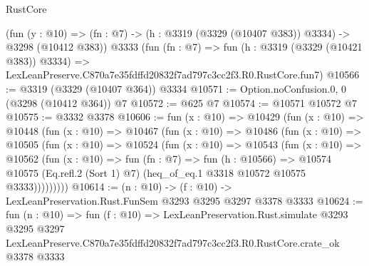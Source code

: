 \begin{lexlean}{RustCore}
\begin{coremodule}
    (fun (y : @10) => (fn : @7) -> (h : @3319 (@3329 (@10407 @383)) @3334) -> @3298 (@10412 @383))
    @3333
    (fun (fn : @7) =>
    fun (h : @3319 (@3329 (@10421 @383)) @3334) =>
    LexLeanPreserve.C870a7e35fdffd20832f7ad797c3cc2f3.R0.RustCore.fun7)
@10566 := @3319 (@3329 (@10407 @364)) @3334
@10571 := Option.noConfusion.{0, 0} (@3298 (@10412 @364)) @7
@10572 := @625 @7
@10574 := @10571 @10572 @7
@10575 := @3332 @3378
@10606 := fun (x : @10) =>
  @10429
    (fun (x : @10) =>
    @10448
      (fun (x : @10) =>
      @10467
        (fun (x : @10) =>
        @10486
          (fun (x : @10) =>
          @10505
            (fun (x : @10) =>
            @10524
              (fun (x : @10) =>
              @10543
                (fun (x : @10) =>
                @10562
                  (fun (x : @10) =>
                  fun (fn : @7) =>
                  fun (h : @10566) =>
                  @10574
                    @10575
                    (Eq.refl.{2} (Sort 1) @7)
                    (heq_of_eq.{1} @3318 @10572 @10575 @3333)))))))))
@10614 := (n : @10) -> (f : @10) -> LexLeanPreservation.Rust.FunSem @3293 @3295 @3297 @3378 @3333
@10624 := fun (n : @10) =>
  fun (f : @10) =>
  LexLeanPreservation.Rust.simulate
    @3293
    @3295
    @3297
    LexLeanPreserve.C870a7e35fdffd20832f7ad797c3cc2f3.R0.RustCore.crate_ok
    @3378
    @3333
\end{coremodule}
\end{lexlean}
